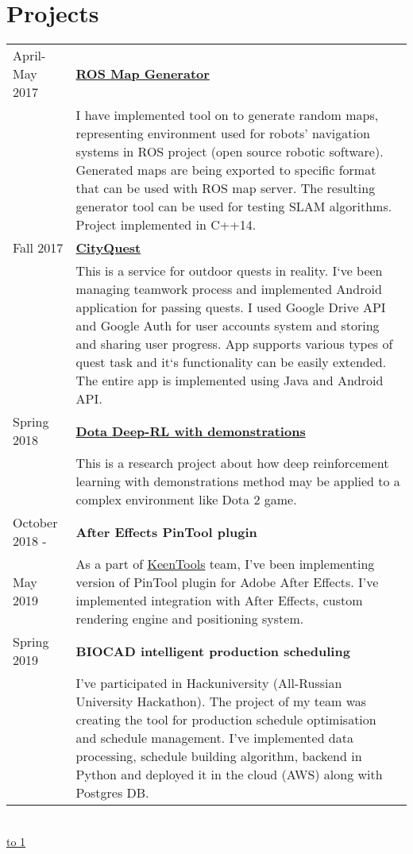 \documentclass[10pt]{article}
\def\LINE{\vspace*{-1em}\noindent \underline{\hbox to 1\textwidth{{ } \hfil{ } \hfil{ } }}}
\begin{document}
\section*{Projects}
\begin{tabular}{p{2.5cm}|p{14.7cm}}
  April-May 2017 \  & \textbf{\href{https://github.com/karvozavr/ROS-Map-Generator}{ROS Map Generator}} \\
  & \footnotesize{I have implemented tool on to generate random maps, representing environment used for robots' navigation systems in ROS project (open source robotic software). Generated maps are being exported to specific format that can be used with ROS map server. The resulting generator tool can be used for testing SLAM algorithms. Project implemented in \textsc{C++14}.}  \\
  Fall 2017  & \textbf{\href{https://github.com/karvozavr/CityQuest/tree/dev}{CityQuest}} \\
  & \footnotesize{This is a service for outdoor quests in reality. I`ve been managing teamwork process and implemented Android application for passing quests. I used Google Drive API and Google Auth for user accounts system and storing and sharing user progress. 
    App supports various types of quest task and it`s functionality can be easily extended. The entire app is implemented using Java and Android API.}   \\
  Spring 2018 & \textbf{\href{https://github.com/karvozavr/DotA-DeepRL}{Dota Deep-RL with demonstrations}} \\
  & \footnotesize{This is a research project about how deep reinforcement learning with demonstrations method may be applied to a complex environment like Dota 2 game.}   \\
    October 2018 - & \textbf{After Effects PinTool plugin} \\
  May 2019 & \footnotesize{As a part of \href{https://www.keentools.io/}{KeenTools} team, I've been implementing version of PinTool plugin for Adobe After Effects. I've implemented integration with After Effects, custom rendering engine and positioning system.} \\
  Spring 2019 & \textbf{BIOCAD intelligent production scheduling} \\
  & \footnotesize{I've participated in Hackuniversity (All-Russian University Hackathon). The project of my team was creating the tool for production schedule optimisation and schedule management. I've implemented data processing, schedule building algorithm, backend in Python and deployed it in the cloud (AWS) along with Postgres DB.}  
\end{tabular}
\\
\LINE
\end{document}
